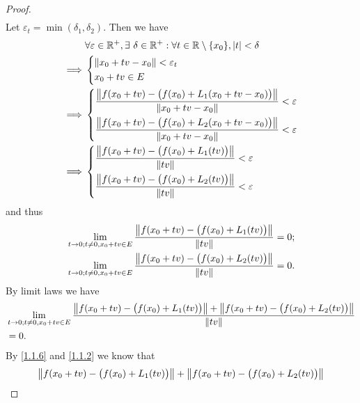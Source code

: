 \begin{proof}
\begin{align*}
  \end{align*}
  Let \(\varepsilon_t = \min(\delta_1, \delta_2)\).
  Then we have
  \begin{align*}
             & \forall \varepsilon \in \R^+, \exists\ \delta \in \R^+ : \forall t \in \R \setminus \{x_0\}, \abs{t} < \delta \\
    \implies & \begin{dcases}
                 \norm*{x_0 + tv - x_0} < \varepsilon_t \\
                 x_0 + tv \in E
               \end{dcases}                                                                        \\
    \implies & \begin{dcases}
                 \dfrac{\norm*{f(x_0 + tv) - \big(f(x_0) + L_1(x_0 + tv - x_0)\big)}}{\norm*{x_0 + tv - x_0}} < \varepsilon \\
                 \dfrac{\norm*{f(x_0 + tv) - \big(f(x_0) + L_2(x_0 + tv - x_0)\big)}}{\norm*{x_0 + tv - x_0}} < \varepsilon
               \end{dcases}                                          \\
    \implies & \begin{dcases}
                 \dfrac{\norm*{f(x_0 + tv) - \big(f(x_0) + L_1(tv)\big)}}{\norm*{tv}} < \varepsilon \\
                 \dfrac{\norm*{f(x_0 + tv) - \big(f(x_0) + L_2(tv)\big)}}{\norm*{tv}} < \varepsilon
               \end{dcases}
  \end{align*}
  and thus
  \begin{align*}
     & \lim_{t \to 0 ; t \neq 0, x_0 + tv \in E} \dfrac{\norm*{f(x_0 + tv) - \big(f(x_0) + L_1(tv)\big)}}{\norm*{tv}} = 0; \\
     & \lim_{t \to 0 ; t \neq 0, x_0 + tv \in E} \dfrac{\norm*{f(x_0 + tv) - \big(f(x_0) + L_2(tv)\big)}}{\norm*{tv}} = 0.
  \end{align*}
  By limit laws we have
  \begin{align*}
     & \lim_{t \to 0 ; t \neq 0, x_0 + tv \in E} \dfrac{\norm*{f(x_0 + tv) - \big(f(x_0) + L_1(tv)\big)} + \norm*{f(x_0 + tv) - \big(f(x_0) + L_2(tv)\big)}}{\norm*{tv}} \\
     & = 0.
  \end{align*}
  By \cref{1.1.6} and \cref{1.1.2} we know that
  \begin{align*}
     & \norm*{f(x_0 + tv) - \big(f(x_0) + L_1(tv)\big)} + \norm*{f(x_0 + tv) - \big(f(x_0) + L_2(tv)\big)}   \\

\end{align*}
\end{proof}
